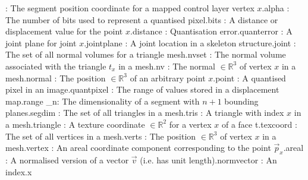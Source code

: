 : {The segment position coordinate for a mapped control layer vertex $x$.}{alpha}
: {The number of bits used to represent a quantised pixel.}{bits}
: {A distance or displacement value for the point $x$.}{distance}
\addsymbol {\varepsilon}: {Quantisation error.}{quanterror}
: {A joint plane for joint $x$.}{jointplane}
: {A joint location in a skeleton structure.}{joint}
: {The set of all normal volumes for a triangle mesh.}{nvset}
: {The normal volume associated with the triangle $t_x$ in a mesh.}{nv}
: {The normal  $\in {\mathbb R}^3$ of vertex $x$ in a mesh.}{normal}
: {The position $\in {\mathbb R}^3$ of an arbitrary point $x$.}{point}
: {A quantised pixel in an image.}{quantpixel}
: {The range of values stored in a displacement map.}{range}
_n: {The dimensionality of a segment with $n+1$ bounding planes.}{segdim}
: {The set of all triangles in a mesh.}{tris}
: {A triangle with index $x$ in a mesh.}{triangle}
: {A texture coordinate $\in {\mathbb R}^2$ for a vertex $x$ of a face t.}{texcoord}
: {The set of all vertices in a mesh.}{verts}
: {The position $\in {\mathbb R}^3$ of vertex $x$ in a mesh.}{vertex}
: {An areal coordinate component corresponding to the point $\vec{p}_x$.}{areal}
: {A normalised version of a vector $\vec{v}$ (i.e. has unit length).}{normvector}
: {An index.}{x}
